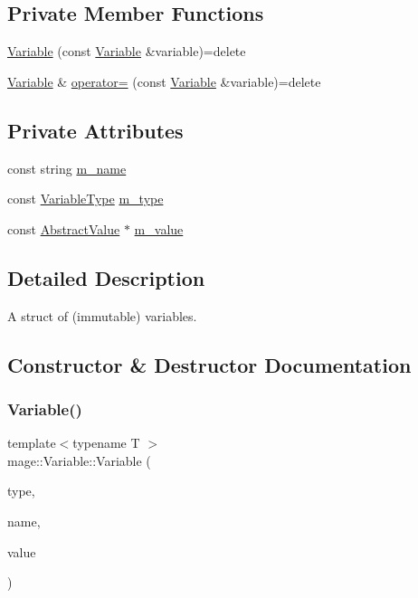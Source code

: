 \subsection*{Private Member Functions}
\begin{DoxyCompactItemize}
\item 
\hyperlink{structmage_1_1_variable_a95b243cd65ea2f9be716545e6c4f4b8e}{Variable} (const \hyperlink{structmage_1_1_variable}{Variable} \&variable)=delete
\item 
\hyperlink{structmage_1_1_variable}{Variable} \& \hyperlink{structmage_1_1_variable_a99029d04b45f356b9681787fdab8a139}{operator=} (const \hyperlink{structmage_1_1_variable}{Variable} \&variable)=delete
\end{DoxyCompactItemize}
\subsection*{Private Attributes}
\begin{DoxyCompactItemize}
\item 
const string \hyperlink{structmage_1_1_variable_afac262aa51bb1dfe447d501abcaa08d0}{m\+\_\+name}
\item 
const \hyperlink{namespacemage_a530428e73bac0ba7fe84b29086a9e33a}{Variable\+Type} \hyperlink{structmage_1_1_variable_acb45a61a0690e0efac614915595c4449}{m\+\_\+type}
\item 
const \hyperlink{structmage_1_1_variable_1_1_abstract_value}{Abstract\+Value} $\ast$ \hyperlink{structmage_1_1_variable_a99388f3fbccf983b8d6954fd31d0eb27}{m\+\_\+value}
\end{DoxyCompactItemize}


\subsection{Detailed Description}
A struct of (immutable) variables. 

\subsection{Constructor \& Destructor Documentation}
\hypertarget{structmage_1_1_variable_aefdee0e7bab3f1a18f0dc1cdc28429b6}{}\label{structmage_1_1_variable_aefdee0e7bab3f1a18f0dc1cdc28429b6} 
\subsubsection{\texorpdfstring{Variable()}{Variable()}\hspace{0.1cm}{\footnotesize\ttfamily [1/2]}}
{\footnotesize\ttfamily template$<$typename T $>$ \\
mage\+::\+Variable\+::\+Variable (\begin{DoxyParamCaption}\item[{\hyperlink{namespacemage_a530428e73bac0ba7fe84b29086a9e33a}{Variable\+Type}}]{type,  }\item[{const string \&}]{name,  }\item[{const T $\ast$}]{value }\end{DoxyParamCaption})}

